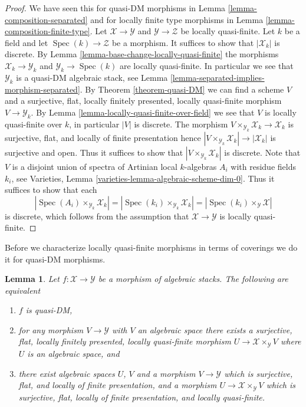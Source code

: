 \documentclass{stacks-project}
\theoremstyle{plain}
\newtheorem{lemma}[subsection]{Lemma}
\theoremstyle{definition}
\theoremstyle{remark}
\numberwithin{equation}{subsection}
\def\Spec{\mathop{\mathrm{Spec}}}
\begin{document}
\begin{proof}
We have seen this for quasi-DM morphisms in
Lemma \ref{lemma-composition-separated}
and for locally finite type morphisms in
Lemma \ref{lemma-composition-finite-type}.
Let $\mathcal{X} \to \mathcal{Y}$ and $\mathcal{Y} \to \mathcal{Z}$
be locally quasi-finite. Let $k$ be a field and let
$\Spec(k) \to \mathcal{Z}$ be a morphism.
It suffices to show that $|\mathcal{X}_k|$ is discrete. By
Lemma \ref{lemma-base-change-locally-quasi-finite}
the morphisms $\mathcal{X}_k \to \mathcal{Y}_k$
and $\mathcal{Y}_k \to \Spec(k)$ are locally quasi-finite.
In particular we see that $\mathcal{Y}_k$ is
a quasi-DM algebraic stack, see
Lemma \ref{lemma-separated-implies-morphism-separated}.
By
Theorem \ref{theorem-quasi-DM}
we can find a scheme $V$ and a surjective, flat, locally finitely presented,
locally quasi-finite morphism $V \to \mathcal{Y}_k$. By
Lemma \ref{lemma-locally-quasi-finite-over-field}
we see that $V$ is locally quasi-finite over $k$, in particular
$|V|$ is discrete. The morphism
$V \times_{\mathcal{Y}_k} \mathcal{X}_k \to \mathcal{X}_k$ is
surjective, flat, and locally of finite presentation hence
$|V \times_{\mathcal{Y}_k} \mathcal{X}_k| \to |\mathcal{X}_k|$
is surjective and open. Thus it suffices to show that
$|V \times_{\mathcal{Y}_k} \mathcal{X}_k|$ is discrete.
Note that $V$ is a disjoint union of spectra of Artinian local
$k$-algebras $A_i$ with residue fields $k_i$, see
Varieties, Lemma \ref{varieties-lemma-algebraic-scheme-dim-0}.
Thus it suffices to show that each
$$
|\Spec(A_i) \times_{\mathcal{Y}_k} \mathcal{X}_k| =
|\Spec(k_i) \times_{\mathcal{Y}_k} \mathcal{X}_k| =
|\Spec(k_i) \times_\mathcal{Y} \mathcal{X}|
$$
is discrete, which follows from the assumption that
$\mathcal{X} \to \mathcal{Y}$ is locally quasi-finite.
\end{proof}

\noindent
Before we characterize locally quasi-finite morphisms in terms of coverings
we do it for quasi-DM morphisms.

\begin{lemma}
\label{lemma-characterize-quasi-DM}
Let $f : \mathcal{X} \to \mathcal{Y}$ be a morphism of algebraic stacks.
The following are equivalent
\begin{enumerate}
\item $f$ is quasi-DM,
\item for any morphism $V \to \mathcal{Y}$ with $V$ an algebraic space
there exists a surjective, flat, locally finitely presented, locally
quasi-finite morphism $U \to \mathcal{X} \times_\mathcal{Y} V$ where
$U$ is an algebraic space, and
\item there exist algebraic spaces $U$, $V$ and a morphism
$V \to \mathcal{Y}$ which is surjective, flat, and
locally of finite presentation, and a morphism
$U \to \mathcal{X} \times_\mathcal{Y} V$ which is surjective, flat,
locally of finite presentation, and locally quasi-finite.
\end{enumerate}
\end{lemma}
\end{document}
